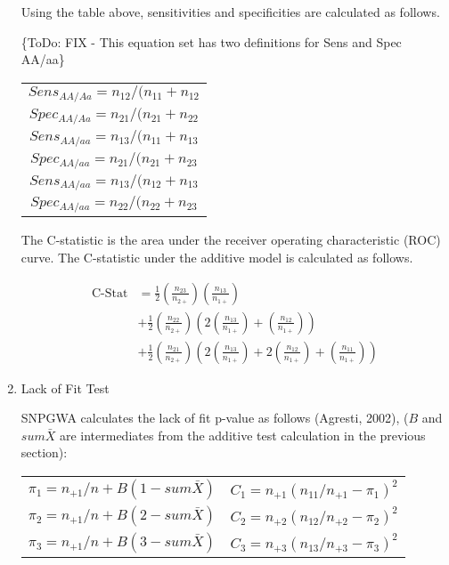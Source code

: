 \begin{enumerate}
Using the table above, sensitivities and specificities are calculated as
follows.

\{ToDo: FIX - This equation set has two definitions for Sens and Spec AA/aa\}
\begin{center}
  \begin{tabular}{c}
    $Sens_{AA/Aa} = n_{12}/(n_{11} + n_{12}$ \\
    $Spec_{AA/Aa} = n_{21}/(n_{21} + n_{22}$ \\
    $Sens_{AA/aa} = n_{13}/(n_{11} + n_{13}$ \\
    $Spec_{AA/aa} = n_{21}/(n_{21} + n_{23}$ \\
    $Sens_{AA/aa} = n_{13}/(n_{12} + n_{13}$ \\
    $Spec_{AA/aa} = n_{22}/(n_{22} + n_{23}$ \\
  \end{tabular}
\end{center}

The C-statistic is the area under the receiver operating characteristic (ROC)
curve.  The C-statistic under the additive model is calculated as follows.

\begin{align*}
  \text{C-Stat} &= \frac{1}{2}\left(\frac{n_{23}}{n_{2+}}\right)\left(\frac{n_{13}}{n_{1+}}\right) \\
          &+ \frac{1}{2}\left(\frac{n_{22}}{n_{2+}}\right)\left(2\left(\frac{n_{13}}{n_{1+}}\right)+\left(\frac{n_{12}}{n_{1+}}\right)\right) \\
          &+ \frac{1}{2}\left(\frac{n_{21}}{n_{2+}}\right)\left(2\left(\frac{n_{13}}{n_{1+}}\right) + 2\left(\frac{n_{12}}{n_{1+}}\right) + \left(\frac{n_{11}}{n_{1+}}\right)\right)
\end{align*}

\item{Lack of Fit Test} 

  SNPGWA calculates the lack of fit p-value as follows (Agresti, 2002), ($B$
  and $sum\bar{X}$ are intermediates from the additive test calculation in the
  previous section):
  \begin{center}
    \begin{tabular}{ll}
      $\pi_1 = n_{+1}/n + B(1-sum\bar{X})$ & $C_1 = n_{+1}(n_{11}/n_{+1} - \pi_1)^2$ \\
      $\pi_2 = n_{+1}/n + B(2-sum\bar{X})$ & $C_2 = n_{+2}(n_{12}/n_{+2} - \pi_2)^2$ \\
      $\pi_3 = n_{+1}/n + B(3-sum\bar{X})$ & $C_3 = n_{+3}(n_{13}/n_{+3} - \pi_3)^2$ \\
    \end{tabular}
  \end{center}


\end{enumerate}
